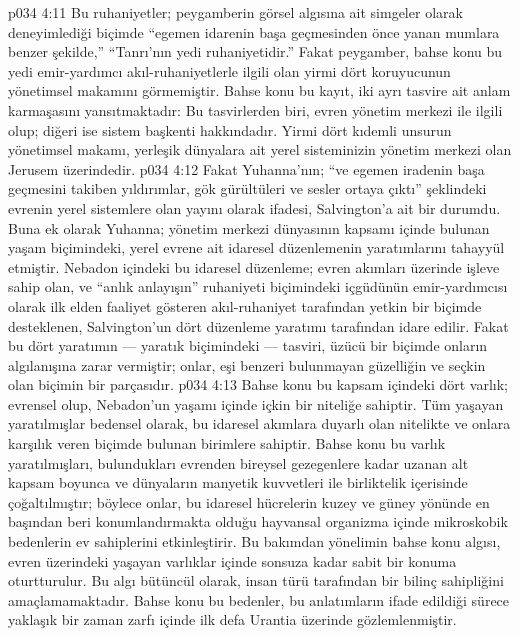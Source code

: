 \vs p034 4:11 Bu ruhaniyetler; peygamberin görsel algısına ait simgeler olarak deneyimlediği biçimde “egemen idarenin başa geçmesinden önce yanan mumlara benzer şekilde,” “Tanrı’nın yedi ruhaniyetidir.” Fakat peygamber, bahse konu bu yedi emir\hyp{}yardımcı akıl\hyp{}ruhaniyetlerle ilgili olan yirmi dört koruyucunun yönetimsel makamını görmemiştir. Bahse konu bu kayıt, iki ayrı tasvire ait anlam karmaşasını yansıtmaktadır: Bu tasvirlerden biri, evren yönetim merkezi ile ilgili olup; diğeri ise sistem başkenti hakkındadır. Yirmi dört kıdemli unsurun yönetimsel makamı, yerleşik dünyalara ait yerel sisteminizin yönetim merkezi olan Jerusem üzerindedir.
\vs p034 4:12 Fakat Yuhanna’nın; “ve egemen iradenin başa geçmesini takiben yıldırımlar, gök gürültüleri ve sesler ortaya çıktı” şeklindeki evrenin yerel sistemlere olan yayını olarak ifadesi, Salvington’a ait bir durumdu. Buna ek olarak Yuhanna; yönetim merkezi dünyasının kapsamı içinde bulunan yaşam biçimindeki, yerel evrene ait idaresel düzenlemenin yaratımlarını tahayyül etmiştir. Nebadon içindeki bu idaresel düzenleme; evren akımları üzerinde işleve sahip olan, ve “anlık anlayışın” ruhaniyeti biçimindeki içgüdünün emir\hyp{}yardımcısı olarak ilk elden faaliyet gösteren akıl\hyp{}ruhaniyet tarafından yetkin bir biçimde desteklenen, Salvington’un dört düzenleme yaratımı tarafından idare edilir. Fakat bu dört yaratımın --- yaratık biçimindeki --- tasviri, üzücü bir biçimde onların algılanışına zarar vermiştir; onlar, eşi benzeri bulunmayan güzelliğin ve seçkin olan biçimin bir parçasıdır.
\vs p034 4:13 Bahse konu bu kapsam içindeki dört varlık; evrensel olup, Nebadon’un yaşamı içinde içkin bir niteliğe sahiptir. Tüm yaşayan yaratılmışlar bedensel olarak, bu idaresel akımlara duyarlı olan nitelikte ve onlara karşılık veren biçimde bulunan birimlere sahiptir. Bahse konu bu varlık yaratılmışları, bulundukları evrenden bireysel gezegenlere kadar uzanan alt kapsam boyunca ve dünyaların manyetik kuvvetleri ile birliktelik içerisinde çoğaltılmıştır; böylece onlar, bu idaresel hücrelerin kuzey ve güney yönünde en başından beri konumlandırmakta olduğu hayvansal organizma içinde mikroskobik bedenlerin ev sahiplerini etkinleştirir. Bu bakımdan yönelimin bahse konu algısı, evren üzerindeki yaşayan varlıklar içinde sonsuza kadar sabit bir konuma oturtturulur. Bu algı bütüncül olarak, insan türü tarafından bir bilinç sahipliğini amaçlamamaktadır. Bahse konu bu bedenler, bu anlatımların ifade edildiği sürece yaklaşık bir zaman zarfı içinde ilk defa Urantia üzerinde gözlemlenmiştir.
